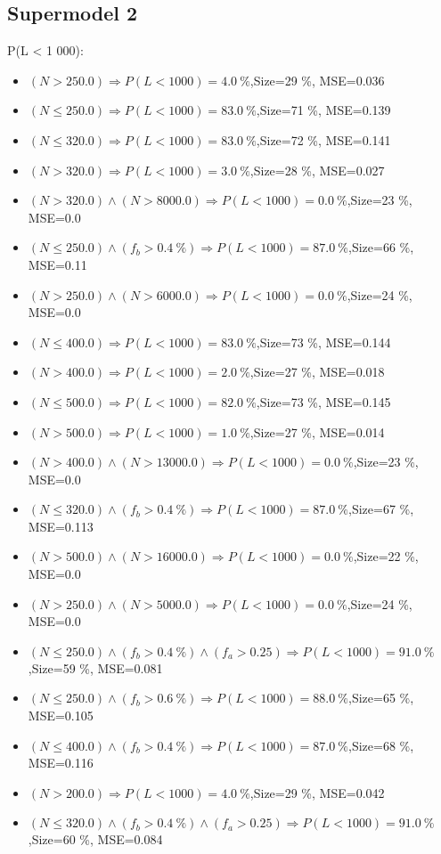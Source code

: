 \documentclass[numbered]{CSL}
\begin{document}
\subsection{Supermodel 2}
P(L < 1 000):
\begin{itemize}
\item $(N > 250.0) \Rightarrow P(L < 1 000) = 4.0~\%$,\hfill Size=29 \%, MSE=0.036
\item $(N \leq 250.0) \Rightarrow P(L < 1 000) = 83.0~\%$,\hfill Size=71 \%, MSE=0.139
\item $(N \leq 320.0) \Rightarrow P(L < 1 000) = 83.0~\%$,\hfill Size=72 \%, MSE=0.141
\item $(N > 320.0) \Rightarrow P(L < 1 000) = 3.0~\%$,\hfill Size=28 \%, MSE=0.027
\item $(N > 320.0) \land (N > 8000.0) \Rightarrow P(L < 1 000) = 0.0~\%$,\hfill Size=23 \%, MSE=0.0
\item $(N \leq 250.0) \land (f_b > 0.4~\%) \Rightarrow P(L < 1 000) = 87.0~\%$,\hfill Size=66 \%, MSE=0.11
\item $(N > 250.0) \land (N > 6000.0) \Rightarrow P(L < 1 000) = 0.0~\%$,\hfill Size=24 \%, MSE=0.0
\item $(N \leq 400.0) \Rightarrow P(L < 1 000) = 83.0~\%$,\hfill Size=73 \%, MSE=0.144
\item $(N > 400.0) \Rightarrow P(L < 1 000) = 2.0~\%$,\hfill Size=27 \%, MSE=0.018
\item $(N \leq 500.0) \Rightarrow P(L < 1 000) = 82.0~\%$,\hfill Size=73 \%, MSE=0.145
\item $(N > 500.0) \Rightarrow P(L < 1 000) = 1.0~\%$,\hfill Size=27 \%, MSE=0.014
\item $(N > 400.0) \land (N > 13000.0) \Rightarrow P(L < 1 000) = 0.0~\%$,\hfill Size=23 \%, MSE=0.0
\item $(N \leq 320.0) \land (f_b > 0.4~\%) \Rightarrow P(L < 1 000) = 87.0~\%$,\hfill Size=67 \%, MSE=0.113
\item $(N > 500.0) \land (N > 16000.0) \Rightarrow P(L < 1 000) = 0.0~\%$,\hfill Size=22 \%, MSE=0.0
\item $(N > 250.0) \land (N > 5000.0) \Rightarrow P(L < 1 000) = 0.0~\%$,\hfill Size=24 \%, MSE=0.0
\item $(N \leq 250.0) \land (f_b > 0.4~\%) \land (f_a > 0.25) \Rightarrow P(L < 1 000) = 91.0~\%$,\hfill Size=59 \%, MSE=0.081
\item $(N \leq 250.0) \land (f_b > 0.6~\%) \Rightarrow P(L < 1 000) = 88.0~\%$,\hfill Size=65 \%, MSE=0.105
\item $(N \leq 400.0) \land (f_b > 0.4~\%) \Rightarrow P(L < 1 000) = 87.0~\%$,\hfill Size=68 \%, MSE=0.116
\item $(N > 200.0) \Rightarrow P(L < 1 000) = 4.0~\%$,\hfill Size=29 \%, MSE=0.042
\item $(N \leq 320.0) \land (f_b > 0.4~\%) \land (f_a > 0.25) \Rightarrow P(L < 1 000) = 91.0~\%$,\hfill Size=60 \%, MSE=0.084
\end{itemize}
\end{document}
